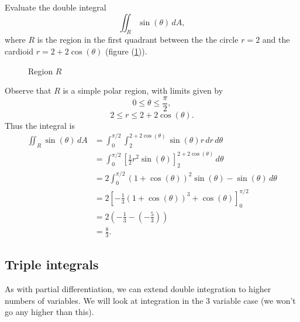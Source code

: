   \begin{example}
    Evaluate the double integral
      \[
        \iint_R \sin(\theta) \, dA,
      \]
    where $R$ is the region in the first quadrant between the the circle $r = 2$ and the cardioid $r = 2 + 2\cos(\theta)$ (figure (\ref{cardioidcircle})).
    
  \begin{figure}[H]
    \centering
    \def\svgwidth{0.5\columnwidth}
    
    \caption{Region $R$}
    \label{cardioidcircle}
  \end{figure}
  
    Observe that $R$ is a simple polar region, with limits given by
      \[
        0 \leq \theta \leq \frac{\pi}{2},
      \]
      \[
        2 \leq r \leq 2 + 2\cos(\theta).
      \]
    Thus the integral is
      \begin{align*}
        \iint_R \sin(\theta) \, dA & = \int\nolimits_0^{\pi/2} \int\nolimits_2^{2 + 2\cos(\theta)} \sin(\theta)r \, dr \, d\theta  \\
        & = \int_0^{\pi/2} \left[\frac{1}{2}r^2\sin(\theta)\right]_2^{2 + 2\cos(\theta)} \, d\theta  \\
        & = 2\int_0^{\pi/2} (1 + \cos(\theta))^2 \sin(\theta) - \sin(\theta) \, d\theta  \\
        & = 2\left[-\frac{1}{3}(1 + \cos(\theta))^3 + \cos(\theta)\right]_0^{\pi/2}  \\
        & = 2\left(-\frac{1}{3}-\left(-\frac{5}{3}\right)\right)  \\
        & = \frac{8}{3}.
      \end{align*}
  \end{example}
  
  
  
\subsection{Triple integrals}

  As with partial differentiation, we can extend double integration to higher numbers of variables.  We will look at integration in the $3$ variable case (we won't go any higher than this).

